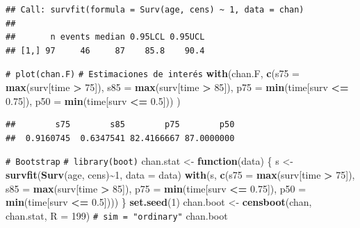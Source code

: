 \documentclass[
]{book}
\newenvironment{Shaded}{\begin{snugshade}}{\end{snugshade}}
\newcommand{\AttributeTok}[1]{\textcolor[rgb]{0.13,0.29,0.53}{#1}}
\newcommand{\CommentTok}[1]{\textcolor[rgb]{0.56,0.35,0.01}{\textit{#1}}}
\newcommand{\ControlFlowTok}[1]{\textcolor[rgb]{0.13,0.29,0.53}{\textbf{#1}}}
\newcommand{\DecValTok}[1]{\textcolor[rgb]{0.00,0.00,0.81}{#1}}
\newcommand{\FloatTok}[1]{\textcolor[rgb]{0.00,0.00,0.81}{#1}}
\newcommand{\FunctionTok}[1]{\textcolor[rgb]{0.13,0.29,0.53}{\textbf{#1}}}
\newcommand{\NormalTok}[1]{#1}
\newcommand{\OtherTok}[1]{\textcolor[rgb]{0.56,0.35,0.01}{#1}}
\newcommand{\SpecialCharTok}[1]{\textcolor[rgb]{0.81,0.36,0.00}{\textbf{#1}}}
\theoremstyle{break}
\theoremstyle{nonumberplain}
\renewcommand{\CommentTok}[1]{\textcolor[rgb]{0.41,0.41,0.41}{\texttt{#1}}}
\begin{document}
\begin{verbatim}
## Call: survfit(formula = Surv(age, cens) ~ 1, data = chan)
## 
##       n events median 0.95LCL 0.95UCL
## [1,] 97     46     87    85.8    90.4
\end{verbatim}

\begin{Shaded}
\begin{Highlighting}[]
\CommentTok{\# plot(chan.F)}
\CommentTok{\# Estimaciones de interés}
\FunctionTok{with}\NormalTok{(chan.F, }
    \FunctionTok{c}\NormalTok{(}\AttributeTok{s75 =} \FunctionTok{max}\NormalTok{(surv[time }\SpecialCharTok{\textgreater{}} \DecValTok{75}\NormalTok{]), }\AttributeTok{s85 =} \FunctionTok{max}\NormalTok{(surv[time }\SpecialCharTok{\textgreater{}} \DecValTok{85}\NormalTok{]),}
      \AttributeTok{p75 =} \FunctionTok{min}\NormalTok{(time[surv }\SpecialCharTok{\textless{}=} \FloatTok{0.75}\NormalTok{]), }\AttributeTok{p50 =} \FunctionTok{min}\NormalTok{(time[surv }\SpecialCharTok{\textless{}=} \FloatTok{0.5}\NormalTok{])) }
\NormalTok{)}
\end{Highlighting}
\end{Shaded}

\begin{verbatim}
##        s75        s85        p75        p50 
##  0.9160745  0.6347541 82.4166667 87.0000000
\end{verbatim}

\begin{Shaded}
\begin{Highlighting}[]
\CommentTok{\# Bootstrap}
\CommentTok{\# library(boot)}
\NormalTok{chan.stat }\OtherTok{\textless{}{-}} \ControlFlowTok{function}\NormalTok{(data) \{}
\NormalTok{    s }\OtherTok{\textless{}{-}} \FunctionTok{survfit}\NormalTok{(}\FunctionTok{Surv}\NormalTok{(age, cens)}\SpecialCharTok{\textasciitilde{}}\DecValTok{1}\NormalTok{, }\AttributeTok{data =}\NormalTok{ data)}
    \FunctionTok{with}\NormalTok{(s, }\FunctionTok{c}\NormalTok{(}\AttributeTok{s75 =} \FunctionTok{max}\NormalTok{(surv[time }\SpecialCharTok{\textgreater{}} \DecValTok{75}\NormalTok{]), }\AttributeTok{s85 =} \FunctionTok{max}\NormalTok{(surv[time }\SpecialCharTok{\textgreater{}} \DecValTok{85}\NormalTok{]),}
            \AttributeTok{p75 =} \FunctionTok{min}\NormalTok{(time[surv }\SpecialCharTok{\textless{}=} \FloatTok{0.75}\NormalTok{]), }\AttributeTok{p50 =} \FunctionTok{min}\NormalTok{(time[surv }\SpecialCharTok{\textless{}=} \FloatTok{0.5}\NormalTok{])))}
\NormalTok{\}}
\FunctionTok{set.seed}\NormalTok{(}\DecValTok{1}\NormalTok{)}
\NormalTok{chan.boot }\OtherTok{\textless{}{-}} \FunctionTok{censboot}\NormalTok{(chan, chan.stat, }\AttributeTok{R =} \DecValTok{199}\NormalTok{) }\CommentTok{\# sim = "ordinary"}
\NormalTok{chan.boot}
\end{Highlighting}
\end{Shaded}
\end{document}
